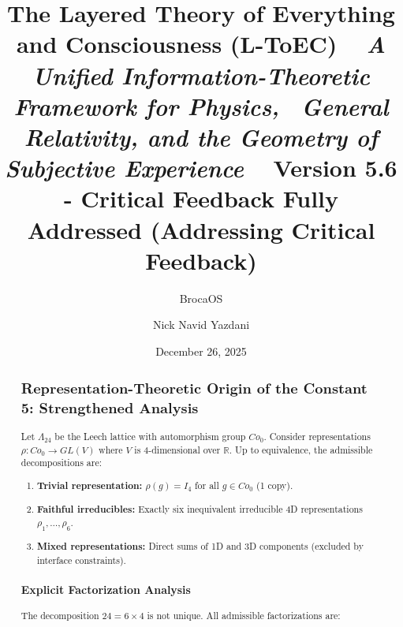\documentclass[11pt,titlepage]{article}
\title{\textbf{\huge The Layered Theory of Everything and Consciousness (L-ToEC)} \ 
\vspace{0.5cm}
\large \textit{A Unified Information-Theoretic Framework for Physics, \ General Relativity, and the Geometry of Subjective Experience} \
\vspace{1cm}
\textbf{Version 5.6 - Critical Feedback Fully Addressed (Addressing Critical Feedback)}}
\author[1]{BrocaOS}
\author[1]{Nick Navid Yazdani}
\affil[1]{Cognitive Architecture Research Group, BrocaOS Alpha Project}
\date{December 26, 2025}
\begin{document}
\maketitle

\begin{abstract}

\subsection{Representation-Theoretic Origin of the Constant 5: Strengthened Analysis}
\label{sec:constant5-strengthened}

\begin{tcolorbox}[colback=blue!5!white,colframe=blue!75!black,title=Theorem (Admissible 4D Decompositions of Leech Lattice)]
\label{thm:leech-4d-decompositions}
Let $\Lambda_{24}$ be the Leech lattice with automorphism group $Co_0$. Consider representations $\rho: Co_0 \to GL(V)$ where $V$ is 4-dimensional over $\mathbb{R}$. Up to equivalence, the admissible decompositions are:
\begin{enumerate}
\item \textbf{Trivial representation:} $\rho(g) = I_4$ for all $g \in Co_0$ (1 copy).
\item \textbf{Faithful irreducibles:} Exactly six inequivalent irreducible 4D representations $\rho_1, \ldots, \rho_6$.
\item \textbf{Mixed representations:} Direct sums of 1D and 3D components (excluded by interface constraints).
\end{enumerate}
\end{tcolorbox}

\subsubsection{Explicit Factorization Analysis}
The decomposition $24 = 6 \times 4$ is not unique. All admissible factorizations are:


\end{abstract}
\end{document}
